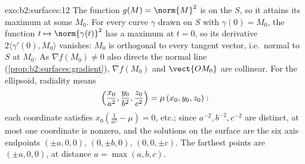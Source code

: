 \begin{solution}{exo:b2:surfaces:12}
The function $g(M) = \norm{M}^2$ is  on the 
$S$, so it attains its maximum at some $M_0$. For every curve
$\gamma$ drawn on $S$ with $\gamma(0) = M_0$, the function $t
\mapsto \norm{\gamma(t)}^2$ has a maximum at $t = 0$, so its
derivative $2\langle\gamma'(0), M_0\rangle$ vanishes: $M_0$ is
orthogonal to every tangent vector, i.e.\ normal to $S$ at
$M_0$. As $\nabla f(M_0) \neq 0$ also directs the normal line
(\cref{prop:b2:surfaces:gradient}), $\nabla f(M_0)$ and
$\vect{OM_0}$ are collinear. For the ellipsoid, radiality
means
\[
\Bigl(\frac{x_0}{a^2}, \frac{y_0}{b^2},
\frac{z_0}{c^2}\Bigr) = \mu\,(x_0, y_0, z_0) :
\]
each coordinate satisfies $x_0(\frac1{a^2} - \mu) = 0$, etc.;
since $a^{-2}, b^{-2}, c^{-2}$ are distinct, at most one
coordinate is nonzero, and the solutions on the surface are
the six axis endpoints $(\pm a, 0, 0)$, $(0, \pm b, 0)$, $(0,
0, \pm c)$. The farthest points are $(\pm a, 0, 0)$, at
distance $a = \max(a,b,c)$.
\end{solution}

